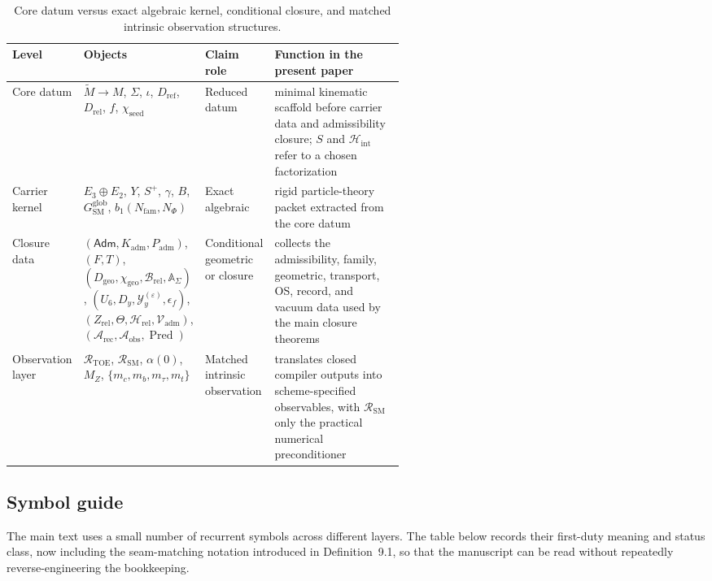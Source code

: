 \documentclass[11pt,a4paper]{article}
\theoremstyle{definition}
\theoremstyle{remark}
\newcommand{\Seam}{\Sigma}
\newcommand{\inv}{\iota}
\newcommand{\bone}{b_1}
\newcommand{\SM}{\mathrm{SM}}
\newcommand{\Arec}{\mathcal A_{\mathrm{rec}}}
\newcommand{\Aobs}{\mathcal A_{\mathrm{obs}}}
\newcommand{\Vadm}{\mathcal V_{\mathrm{adm}}}
\newcommand{\Hrel}{\mathcal H_{\mathrm{rel}}}
\newcommand{\Pred}{\operatorname{Pred}}
\newcommand{\Hint}{\mathcal H_{\mathrm{int}}}
\newcommand{\Kadm}{K_{\mathrm{adm}}}
\newcommand{\chiseed}{\chi_{\mathrm{seed}}}
\newcommand{\chigeo}{\chi_{\mathrm{geo}}}
\newcommand{\Padm}{P_{\mathrm{adm}}}
\begin{document}
\begin{table}[t]
\centering
\small
\begin{tabularx}{\linewidth}{@{}>{\raggedright\arraybackslash}p{0.12\linewidth}>{\raggedright\arraybackslash}p{0.31\linewidth}>{\raggedright\arraybackslash}p{0.13\linewidth}Y@{}}
\toprule
Level & Objects & Claim role & Function in the present paper \\
\midrule
Core datum & $\widetilde M\to M$, $\Seam$, $\inv$, $D_{\mathrm{ref}}$, $D_{\mathrm{rel}}$, $f$, $\chiseed$ & Reduced datum & minimal kinematic scaffold before carrier data and admissibility closure; $S$ and $\Hint$ refer to a chosen factorization \\
Carrier kernel & $E_3\oplus E_2$, $Y$, $S^+$, $\gamma$, $B$, $G_{\SM}^{\mathrm{glob}}$, $\bone(N_{\mathrm{fam}},N_\Phi)$ & Exact algebraic & rigid particle-theory packet extracted from the core datum \\
Closure data & $(\mathsf{Adm},\Kadm,\Padm)$, $(F,T)$, $(D_{\mathrm{geo}},\chigeo,\mathcal B_{\mathrm{rel}},\mathbb A_{\Seam})$, $(U_6,D_y,\mathcal Y_y^{(\varepsilon)},\epsilon_f)$, $(Z_{\mathrm{rel}},\Theta,\Hrel,\Vadm)$, $(\Arec,\Aobs,\Pred)$ & Conditional geometric or closure & collects the admissibility, family, geometric, transport, OS, record, and vacuum data used by the main closure theorems \\
Observation layer & $\mathcal R_{\mathrm{TOE}}$, $\mathcal R_{\SM}$, $\alpha(0)$, $M_Z$, $\{m_c,m_b,m_\tau,m_t\}$ & Matched intrinsic observation & translates closed compiler outputs into scheme-specified observables, with $\mathcal R_{\SM}$ only the practical numerical preconditioner \\
\bottomrule
\end{tabularx}
\caption{Core datum versus exact algebraic kernel, conditional closure, and matched intrinsic observation structures.}
\label{tab:layered-datum}
\end{table}

\subsection{Symbol guide}

The main text uses a small number of recurrent symbols across different layers. The table below records their first-duty meaning and status class, now including the seam-matching notation introduced in Definition~9.1, so that the manuscript can be read without repeatedly reverse-engineering the bookkeeping.
\end{document}
